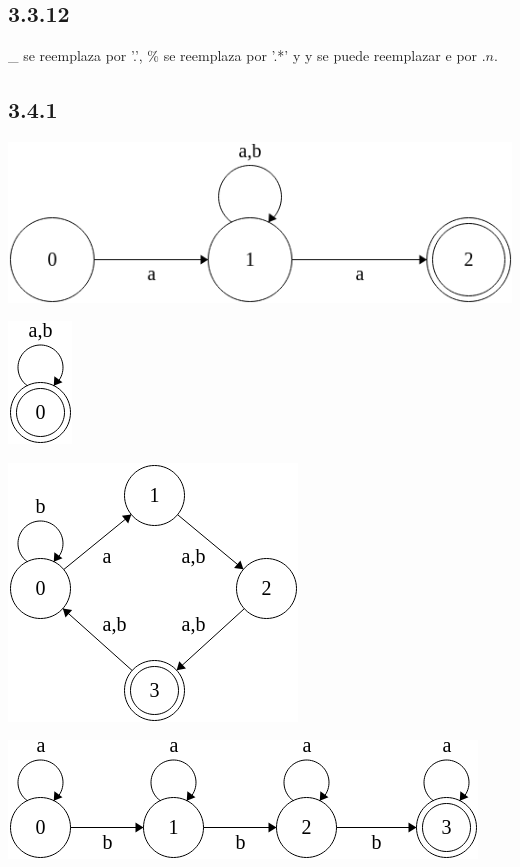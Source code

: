\documentclass{article}
\begin{document}
\subsection*{3.3.12}
\_ se reemplaza por '.', \% se reemplaza por '.*' y y se puede reemplazar e por $.{n}$. 
\subsection*{3.4.1}

\begin{center}
\includegraphics[scale=.5]{a}
\end{center}
\begin{center}   
\includegraphics[scale=.5]{b}
\end{center}
\begin{center}
\includegraphics[scale=.5]{c}
\end{center}
\begin{center}
\includegraphics[scale=.5]{d}
\end{center}
\end{document}
